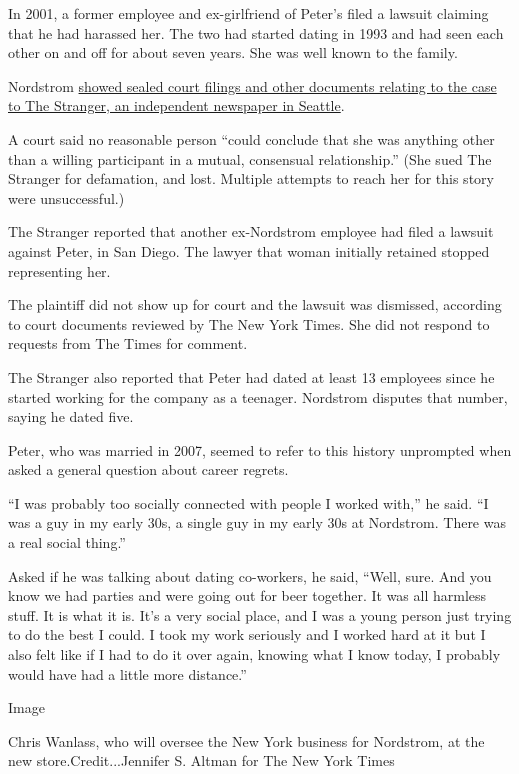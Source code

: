 In 2001, a former employee and ex-girlfriend of Peter's filed a lawsuit
claiming that he had harassed her. The two had started dating in 1993
and had seen each other on and off for about seven years. She was well
known to the family.

Nordstrom
\href{https://www.thestranger.com/seattle/uncomfortable-suit/Content?oid=12242}{showed
sealed court filings and other documents relating to the case to The
Stranger, an independent newspaper in Seattle}.

A court said no reasonable person ``could conclude that she was anything
other than a willing participant in a mutual, consensual relationship.''
(She sued The Stranger for defamation, and lost. Multiple attempts to
reach her for this story were unsuccessful.)

The Stranger reported that another ex-Nordstrom employee had filed a
lawsuit against Peter, in San Diego. The lawyer that woman initially
retained stopped representing her.

The plaintiff did not show up for court and the lawsuit was dismissed,
according to court documents reviewed by The New York Times. She did not
respond to requests from The Times for comment.

The Stranger also reported that Peter had dated at least 13 employees
since he started working for the company as a teenager. Nordstrom
disputes that number, saying he dated five.

Peter, who was married in 2007, seemed to refer to this history
unprompted when asked a general question about career regrets.

``I was probably too socially connected with people I worked with,'' he
said. ``I was a guy in my early 30s, a single guy in my early 30s at
Nordstrom. There was a real social thing.''

Asked if he was talking about dating co-workers, he said, ``Well, sure.
And you know we had parties and were going out for beer together. It was
all harmless stuff. It is what it is. It's a very social place, and I
was a young person just trying to do the best I could. I took my work
seriously and I worked hard at it but I also felt like if I had to do it
over again, knowing what I know today, I probably would have had a
little more distance.''

Image

Chris Wanlass, who will oversee the New York business for Nordstrom, at
the new store.Credit...Jennifer S. Altman for The New York Times

